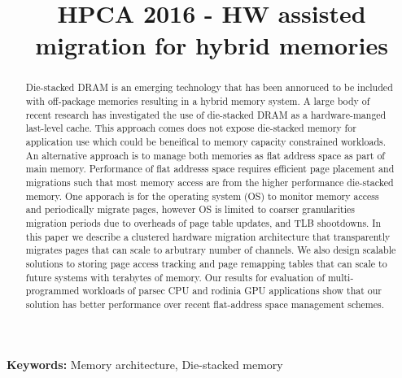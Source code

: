 \documentclass[pageno]{jpaper}
\newcommand{\TODO}[1]{\textcolor{red}{\todo{#1}}}
\begin{document}
\title{HPCA 2016 - HW assisted migration for hybrid memories}

\date{}
\maketitle

\thispagestyle{empty}

\begin{abstract}
  Die-stacked DRAM is an emerging technology that has been annoruced to be included with off-package memories resulting in a hybrid memory system. A large body of recent research has investigated the use of die-stacked DRAM as a hardware-manged last-level cache. This approach comes does not expose die-stacked memory for application use which could be beneifical to memory capacity constrained workloads. An alternative approach is to manage both memories as flat address space as part of main memory. Performance of flat addresss space requires efficient page placement and migrations such that most memory access are from the higher performance die-stacked memory. One apporach is for the operating system (OS) to monitor memory access and periodically migrate pages, however OS is limited to coarser granularities migration periods due to overheads of page table updates, and TLB shootdowns. In this paper we describe a clustered hardware migration architecture that transparently migrates pages that can scale to arbutrary number of channels. We also design scalable solutions to storing page access tracking and page remapping tables that can scale to future systems with terabytes of memory. Our results for evaluation of  multi-programmed workloads of parsec CPU and rodinia GPU applications show that our solution has \TODO{XX\%} better performance over recent flat-address space management schemes. 
\end{abstract}

\noindent \textbf{Keywords:} Memory architecture, Die-stacked memory










\end{document}
